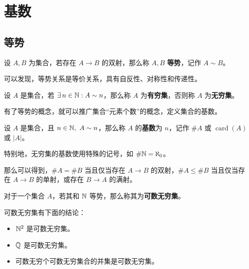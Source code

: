 \section{基数}

\subsection{等势}

\begin{definition}[等势]
    设 $A, B$ 为集合，若存在 $A \to B$ 的双射，那么称 $A, B$ \textbf{等势}，记作 $A \sim B$。
\end{definition}

可以发现，等势关系是等价关系，具有自反性、对称性和传递性。

\begin{definition}[有穷集]
    设 $A$ 是集合，若 $\exists\,n \in \mathbb{N}: A \sim n$，那么称 $A$ 为\textbf{有穷集}，否则称 $A$ 为\textbf{无穷集}。
\end{definition}

有了等势的概念，就可以推广集合“元素个数”的概念，定义集合的基数。

\begin{definition}[基数]
    设 $A$ 是集合，且 $n \in \mathbb{N},\ A \sim n$，那么称 $A$ 的\textbf{基数}为 $n$，记作 $\# A$ 或 $\operatorname{card}(A)$ 或 $|A|$。

    特别地，无穷集的基数使用特殊的记号，如 $\# \mathbb{N} = \aleph_0$。
\end{definition}

那么可以得到，$\# A = \# B$ 当且仅当存在 $A \to B$ 的双射，$\# A \le \# B$ 当且仅当存在 $A \to B$ 的单射，或存在 $B \to A$ 的满射。

\begin{definition}[可数无穷集]
    对于一个集合 $A$，若其和 $\mathbb{N}$ 等势，那么称其为\textbf{可数无穷集}。
\end{definition}

可数无穷集有下面的结论：
\begin{itemize}
    \item $\mathbb{N}^2$ 是可数无穷集。
    \item $\mathbb{Q}$ 是可数无穷集。
    \item 可数无穷个可数无穷集合的并集是可数无穷集。
\end{itemize}

